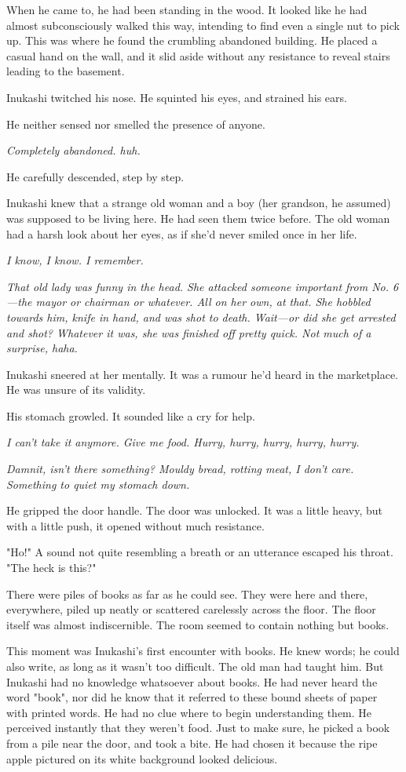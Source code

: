 When he came to, he had been standing in the wood. It looked like he had
almost subconsciously walked this way, intending to find even a single
nut to pick up. This was where he found the crumbling abandoned
building. He placed a casual hand on the wall, and it slid aside without
any resistance to reveal stairs leading to the basement.

Inukashi twitched his nose. He squinted his eyes, and strained his ears.

He neither sensed nor smelled the presence of anyone.

\emph{Completely abandoned. huh.}

He carefully descended, step by step.

Inukashi knew that a strange old woman and a boy (her grandson, he
assumed) was supposed to be living here. He had seen them twice before.
The old woman had a harsh look about her eyes, as if she'd never smiled
once in her life.

\emph{I know, I know. I remember.}

\emph{That old lady was funny in the head. She attacked someone important from
No. 6---the mayor or chairman or whatever. All on her own, at that. She
hobbled towards him, knife in hand, and was shot to death. Wait---or did
she get arrested and shot? Whatever it was, she was finished off pretty
quick. Not much of a surprise, haha.}

Inukashi sneered at her mentally. It was a rumour he'd heard in the
marketplace. He was unsure of its validity.

His stomach growled. It sounded like a cry for help.

\emph{I can't take it anymore. Give me food. Hurry, hurry, hurry, hurry,
hurry.}

\emph{Damnit, isn't there something? Mouldy bread, rotting meat, I don't care.
Something to quiet my stomach down.}

He gripped the door handle. The door was unlocked. It was a little
heavy, but with a little push, it opened without much resistance.

"Ho!" A sound not quite resembling a breath or an utterance escaped his
throat. "The heck is this?"

There were piles of books as far as he could see. They were here and
there, everywhere, piled up neatly or scattered carelessly across the
floor. The floor itself was almost indiscernible. The room seemed to
contain nothing but books.

This moment was Inukashi's first encounter with books. He knew words; he
could also write, as long as it wasn't too difficult. The old man had
taught him. But Inukashi had no knowledge whatsoever about books. He had
never heard the word "book", nor did he know that it referred to these
bound sheets of paper with printed words. He had no clue where to begin
understanding them. He perceived instantly that they weren't food. Just
to make sure, he picked a book from a pile near the door, and took a
bite. He had chosen it because the ripe apple pictured on its white
background looked delicious.

